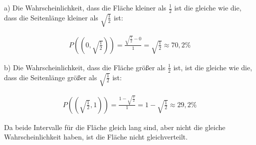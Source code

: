 \documentclass[11pt,a4paper]{article}
\begin{document}
  a) Die Wahrscheinlichkeit, dass die Fläche kleiner als $\frac{1}{2}$ ist die gleiche wie die, dass die Seitenlänge kleiner als $\sqrt{\frac{1}{2}}$ ist:

  \begin{align*}
    P((0,\sqrt{\frac{1}{2}})) = \frac{\sqrt{\frac{1}{2}} - 0}{1} = \sqrt{\frac{1}{2}} \approx 70,2 \%
  \end{align*}

  b) Die Wahrscheinlichkeit, dass die Fläche größer als $\frac{1}{2}$ ist, ist die gleiche wie die, dass die Seitenlänge größer als $\sqrt{\frac{1}{2}}$ ist:

  \begin{align*}
    P((\sqrt{\frac{1}{2}},1)) = \frac{1 - \sqrt{\frac{1}{2}}}{1} = 1 - \sqrt{\frac{1}{2}} \approx 29,2 \%
  \end{align*}

  Da beide Intervalle für die Fläche gleich lang sind, aber nicht die gleiche Wahrscheinlichkeit haben, ist die Fläche nicht gleichverteilt.
\end{document}
